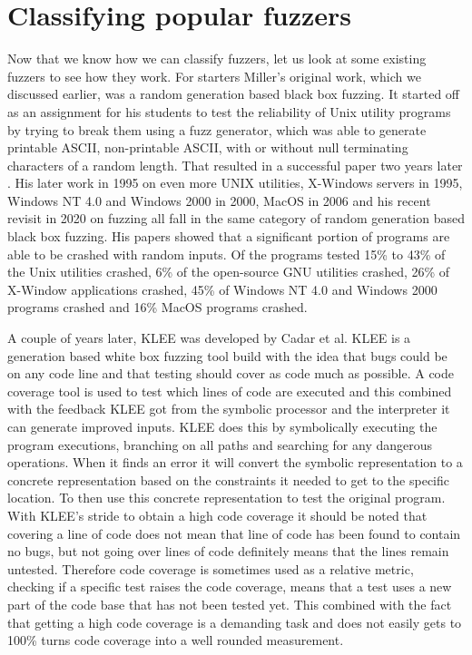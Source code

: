 \section{Classifying popular fuzzers}
\label{fuzzing:OtherFuzzers}
Now that we know how we can classify fuzzers, let us look at some existing fuzzers to see how they work. For starters Miller's original work, which we discussed earlier, was a random generation based black box fuzzing. It started off as an assignment for his students to test the reliability of Unix utility programs by trying to break them using a fuzz generator, which was able to generate printable ASCII, non-printable ASCII, with or without null terminating characters of a random length. That resulted in a successful paper two years later \cite{4originalFuzzingUnixUtils}. His later work in 1995 on even more UNIX utilities, X-Windows servers \cite{26miller1995fuzzrevisited} in 1995, Windows NT 4.0 and Windows 2000 \cite{24MillerWindows} in 2000, MacOS \cite{25MillerOnMacOS} in 2006 and his recent revisit in 2020 on fuzzing \cite{3miller2020relevanceOfClasicalFuzzTesting} all fall in the same category of random generation based black box fuzzing. His papers showed that a significant portion of programs are able to be crashed with random inputs. Of the programs tested 15\% to 43\% of the Unix utilities crashed, 6\% of the open-source GNU utilities crashed, 26\% of X-Window applications crashed, 45\% of Windows NT 4.0 and Windows 2000 programs crashed and 16\% MacOS programs crashed.

A couple of years later, KLEE \cite{8KLEE} was developed by Cadar et al. KLEE is a generation based white box fuzzing tool build with the idea that bugs could be on any code line and that testing should cover as code much as possible. A code coverage tool is used to test which lines of code are executed and this combined with the feedback KLEE got from the symbolic processor and the interpreter it can generate improved inputs. KLEE does this by symbolically executing the program executions, branching on all paths and searching for any dangerous operations. When it finds an error it will convert the symbolic representation to a concrete representation based on the constraints it needed to get to the specific location. To then use this concrete representation to test the original program.
With KLEE's stride to obtain a high code coverage it should be noted that covering a line of code does not mean that line of code has been found to contain no bugs, but not going over lines of code definitely means that the lines remain untested. Therefore code coverage is sometimes used as a relative metric, checking if a specific test raises the code coverage, means that a test uses a new part of the code base that has not been tested yet. This combined with the fact that getting a high code coverage is a demanding task and does not easily gets to 100\% turns code coverage into a well rounded measurement.

